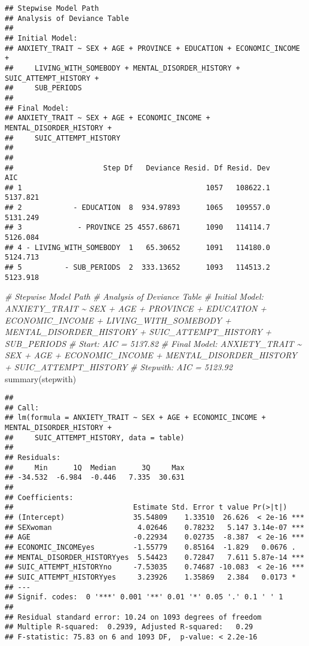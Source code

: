 \documentclass[
]{book}
\newenvironment{Shaded}{\begin{snugshade}}{\end{snugshade}}
\newcommand{\CommentTok}[1]{\textcolor[rgb]{0.56,0.35,0.01}{\textit{#1}}}
\newcommand{\FunctionTok}[1]{\textcolor[rgb]{0.00,0.00,0.00}{#1}}
\newcommand{\NormalTok}[1]{#1}
\begin{document}
\begin{verbatim}
## Stepwise Model Path 
## Analysis of Deviance Table
## 
## Initial Model:
## ANXIETY_TRAIT ~ SEX + AGE + PROVINCE + EDUCATION + ECONOMIC_INCOME + 
##     LIVING_WITH_SOMEBODY + MENTAL_DISORDER_HISTORY + SUIC_ATTEMPT_HISTORY + 
##     SUB_PERIODS
## 
## Final Model:
## ANXIETY_TRAIT ~ SEX + AGE + ECONOMIC_INCOME + MENTAL_DISORDER_HISTORY + 
##     SUIC_ATTEMPT_HISTORY
## 
## 
##                     Step Df   Deviance Resid. Df Resid. Dev      AIC
## 1                                           1057   108622.1 5137.821
## 2            - EDUCATION  8  934.97893      1065   109557.0 5131.249
## 3             - PROVINCE 25 4557.68671      1090   114114.7 5126.084
## 4 - LIVING_WITH_SOMEBODY  1   65.30652      1091   114180.0 5124.713
## 5          - SUB_PERIODS  2  333.13652      1093   114513.2 5123.918
\end{verbatim}

\begin{Shaded}
\begin{Highlighting}[]
\CommentTok{\# Stepwise Model Path }
\CommentTok{\# Analysis of Deviance Table}
\CommentTok{\# Initial Model: ANXIETY\_TRAIT \textasciitilde{} SEX + AGE + PROVINCE + EDUCATION + ECONOMIC\_INCOME + LIVING\_WITH\_SOMEBODY + MENTAL\_DISORDER\_HISTORY + SUIC\_ATTEMPT\_HISTORY + SUB\_PERIODS}
\CommentTok{\# Start:  AIC = 5137.82}
\CommentTok{\# Final Model: ANXIETY\_TRAIT \textasciitilde{} SEX + AGE + ECONOMIC\_INCOME + MENTAL\_DISORDER\_HISTORY + SUIC\_ATTEMPT\_HISTORY}
\CommentTok{\# Stepwith:  AIC = 5123.92}
\FunctionTok{summary}\NormalTok{(stepwith)}
\end{Highlighting}
\end{Shaded}

\begin{verbatim}
## 
## Call:
## lm(formula = ANXIETY_TRAIT ~ SEX + AGE + ECONOMIC_INCOME + MENTAL_DISORDER_HISTORY + 
##     SUIC_ATTEMPT_HISTORY, data = table)
## 
## Residuals:
##     Min      1Q  Median      3Q     Max 
## -34.532  -6.984  -0.446   7.335  30.631 
## 
## Coefficients:
##                            Estimate Std. Error t value Pr(>|t|)    
## (Intercept)                35.54809    1.33510  26.626  < 2e-16 ***
## SEXwoman                    4.02646    0.78232   5.147 3.14e-07 ***
## AGE                        -0.22934    0.02735  -8.387  < 2e-16 ***
## ECONOMIC_INCOMEyes         -1.55779    0.85164  -1.829   0.0676 .  
## MENTAL_DISORDER_HISTORYyes  5.54423    0.72847   7.611 5.87e-14 ***
## SUIC_ATTEMPT_HISTORYno     -7.53035    0.74687 -10.083  < 2e-16 ***
## SUIC_ATTEMPT_HISTORYyes     3.23926    1.35869   2.384   0.0173 *  
## ---
## Signif. codes:  0 '***' 0.001 '**' 0.01 '*' 0.05 '.' 0.1 ' ' 1
## 
## Residual standard error: 10.24 on 1093 degrees of freedom
## Multiple R-squared:  0.2939, Adjusted R-squared:   0.29 
## F-statistic: 75.83 on 6 and 1093 DF,  p-value: < 2.2e-16
\end{verbatim}
\end{document}
